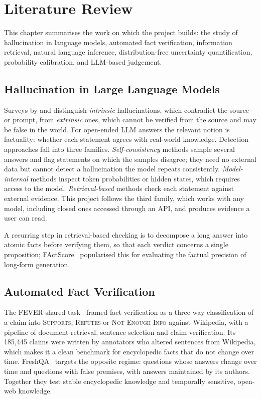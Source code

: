 \chapter{Literature Review}
\label{ch:lit}

This chapter summarises the work on which the project builds: the study of hallucination in language models, automated fact verification, information retrieval, natural language inference, distribution-free uncertainty quantification, probability calibration, and LLM-based judgement.

\section{Hallucination in Large Language Models}

Surveys by \citet{ji2023survey} and \citet{huang2023survey} distinguish \emph{intrinsic} hallucinations, which contradict the source or prompt, from \emph{extrinsic} ones, which cannot be verified from the source and may be false in the world. For open-ended LLM answers the relevant notion is factuality: whether each statement agrees with real-world knowledge. Detection approaches fall into three families. \emph{Self-consistency} methods sample several answers and flag statements on which the samples disagree; they need no external data but cannot detect a hallucination the model repeats consistently. \emph{Model-internal} methods inspect token probabilities or hidden states, which requires access to the model. \emph{Retrieval-based} methods check each statement against external evidence. This project follows the third family, which works with any model, including closed ones accessed through an API, and produces evidence a user can read.

A recurring step in retrieval-based checking is to decompose a long answer into atomic facts before verifying them, so that each verdict concerns a single proposition; FActScore~\citep{min2023factscore} popularised this for evaluating the factual precision of long-form generation.

\section{Automated Fact Verification}

The FEVER shared task~\citep{thorne2018fever} framed fact verification as a three-way classification of a claim into \textsc{Supports}, \textsc{Refutes} or \textsc{Not Enough Info} against Wikipedia, with a pipeline of document retrieval, sentence selection and claim verification. Its 185{,}445 claims were written by annotators who altered sentences from Wikipedia, which makes it a clean benchmark for encyclopedic facts that do not change over time. FreshQA~\citep{vu2023freshllms} targets the opposite regime: questions whose answers change over time and questions with false premises, with answers maintained by its authors. Together they test stable encyclopedic knowledge and temporally sensitive, open-web knowledge.

